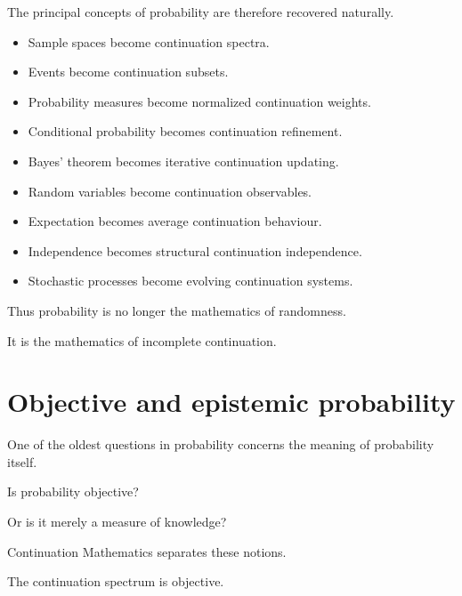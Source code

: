 \documentclass[13pt,openany]{book}
\theoremstyle{plain}
\theoremstyle{definition}
\begin{document}
The principal concepts of probability are therefore recovered naturally.

\begin{itemize}

\item Sample spaces become continuation spectra.

\item Events become continuation subsets.

\item Probability measures become normalized continuation weights.

\item Conditional probability becomes continuation refinement.

\item Bayes' theorem becomes iterative continuation updating.

\item Random variables become continuation observables.

\item Expectation becomes average continuation behaviour.

\item Independence becomes structural continuation independence.

\item Stochastic processes become evolving continuation systems.

\end{itemize}

Thus probability is no longer the mathematics of randomness.

It is the mathematics of incomplete continuation.

\section{Objective and epistemic probability}

One of the oldest questions in probability concerns the meaning of
probability itself.

Is probability objective?

Or is it merely a measure of knowledge?

Continuation Mathematics separates these notions.

The continuation spectrum is objective.
\end{document}
